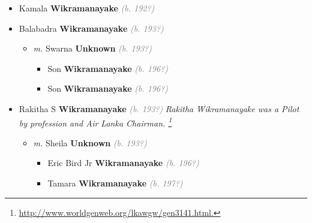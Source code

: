 \documentclass[10pt, openany]{book}
\begin{document}
\begin{itemize}
{\begin{itemize}
{\begin{itemize}
{\begin{itemize}
{\begin{itemize}
{\begin{itemize}
{\begin{itemize}
{\begin{itemize}
{ }
\item{Enakshi \textbf{Wikramanayake} \textcolor{gray}{\textit{(b. 200?)}}
 }
\end{itemize}}
\end{itemize}
  }
\end{itemize}}
\end{itemize}
 }
\item{Kamala \textbf{Wikramanayake} \textcolor{gray}{\textit{(b. 192?)}}
 }
\item{Balabadra \textbf{Wikramanayake} \textcolor{gray}{\textit{(b. 193?)}}
\begin{itemize}
\item{\textit{m.} Swarna \textbf{Unknown} \textcolor{gray}{\textit{(b. 193?)}}   \label{couple:00003929:00003930} \begin{itemize}
\item{Son \textbf{Wikramanayake} \textcolor{gray}{\textit{(b. 196?)}}
 }
\item{Son \textbf{Wikramanayake} \textcolor{gray}{\textit{(b. 196?)}}
 }
\end{itemize}}
\end{itemize}
 }
\item{Rakitha S \textbf{Wikramanayake} \textcolor{gray}{\textit{(b. 193?)}} \textcolor{slmaroon}{\textit{Rakitha Wikramanayake was a Pilot by profession and Air Lanka Chairman.
\footnote{\url{http://www.worldgenweb.org/lkawgw/gen3141.html.}}}}
\begin{itemize}
\item{\textit{m.} Sheila \textbf{Unknown} \textcolor{gray}{\textit{(b. 193?)}}   \label{couple:00003933:00003934} \begin{itemize}
\item{Eric Bird Jr \textbf{Wikramanayake} \textcolor{gray}{\textit{(b. 196?)}}
   }
\item{Tamara \textbf{Wikramanayake} \textcolor{gray}{\textit{(b. 197?)}}
 }
\end{itemize}}
\end{itemize}
  }
\end{itemize}}
\end{itemize}
}
\end{itemize}}
\end{itemize}
\end{document}
